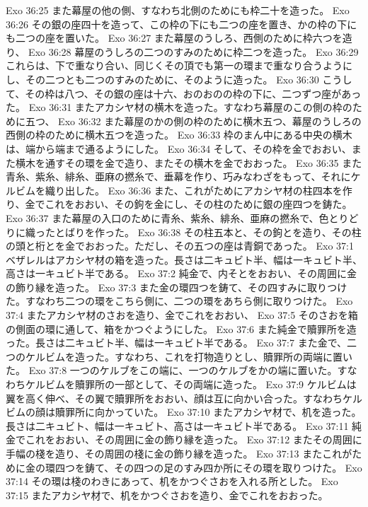 Exo 36:25  また幕屋の他の側、すなわち北側のためにも枠二十を造った。
Exo 36:26  その銀の座四十を造って、この枠の下にも二つの座を置き、かの枠の下にも二つの座を置いた。
Exo 36:27  また幕屋のうしろ、西側のために枠六つを造り、
Exo 36:28  幕屋のうしろの二つのすみのために枠二つを造った。
Exo 36:29  これらは、下で重なり合い、同じくその頂でも第一の環まで重なり合うようにし、その二つとも二つのすみのために、そのように造った。
Exo 36:30  こうして、その枠は八つ、その銀の座は十六、おのおのの枠の下に、二つずつ座があった。
Exo 36:31  またアカシヤ材の横木を造った。すなわち幕屋のこの側の枠のために五つ、
Exo 36:32  また幕屋のかの側の枠のために横木五つ、幕屋のうしろの西側の枠のために横木五つを造った。
Exo 36:33  枠のまん中にある中央の横木は、端から端まで通るようにした。
Exo 36:34  そして、その枠を金でおおい、また横木を通すその環を金で造り、またその横木を金でおおった。
Exo 36:35  また青糸、紫糸、緋糸、亜麻の撚糸で、垂幕を作り、巧みなわざをもって、それにケルビムを織り出した。
Exo 36:36  また、これがためにアカシヤ材の柱四本を作り、金でこれをおおい、その鉤を金にし、その柱のために銀の座四つを鋳た。
Exo 36:37  また幕屋の入口のために青糸、紫糸、緋糸、亜麻の撚糸で、色とりどりに織ったとばりを作った。
Exo 36:38  その柱五本と、その鉤とを造り、その柱の頭と桁とを金でおおった。ただし、その五つの座は青銅であった。
Exo 37:1  ベザレルはアカシヤ材の箱を造った。長さは二キュビト半、幅は一キュビト半、高さは一キュビト半である。
Exo 37:2  純金で、内そとをおおい、その周囲に金の飾り縁を造った。
Exo 37:3  また金の環四つを鋳て、その四すみに取りつけた。すなわち二つの環をこちら側に、二つの環をあちら側に取りつけた。
Exo 37:4  またアカシヤ材のさおを造り、金でこれをおおい、
Exo 37:5  そのさおを箱の側面の環に通して、箱をかつぐようにした。
Exo 37:6  また純金で贖罪所を造った。長さは二キュビト半、幅は一キュビト半である。
Exo 37:7  また金で、二つのケルビムを造った。すなわち、これを打物造りとし、贖罪所の両端に置いた。
Exo 37:8  一つのケルブをこの端に、一つのケルブをかの端に置いた。すなわちケルビムを贖罪所の一部として、その両端に造った。
Exo 37:9  ケルビムは翼を高く伸べ、その翼で贖罪所をおおい、顔は互に向かい合った。すなわちケルビムの顔は贖罪所に向かっていた。
Exo 37:10  またアカシヤ材で、机を造った。長さは二キュビト、幅は一キュビト、高さは一キュビト半である。
Exo 37:11  純金でこれをおおい、その周囲に金の飾り縁を造った。
Exo 37:12  またその周囲に手幅の棧を造り、その周囲の棧に金の飾り縁を造った。
Exo 37:13  またこれがために金の環四つを鋳て、その四つの足のすみ四か所にその環を取りつけた。
Exo 37:14  その環は棧のわきにあって、机をかつぐさおを入れる所とした。
Exo 37:15  またアカシヤ材で、机をかつぐさおを造り、金でこれをおおった。
